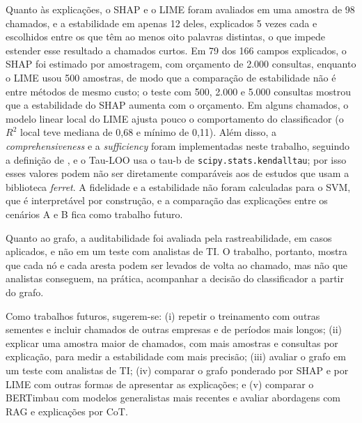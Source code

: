 \documentclass[
    12pt,                %
    openright,           %
    oneside,             %
    a4paper,             %
    english,             %
    brazil               %
]{abntex2}
\begin{document}
Quanto às explicações, o SHAP e o LIME foram avaliados em uma amostra de 98 chamados, e a estabilidade em apenas 12 deles, explicados 5 vezes cada e escolhidos entre os que têm ao menos oito palavras distintas, o que impede estender esse resultado a chamados curtos. Em 79 dos 166 campos explicados, o SHAP foi estimado por amostragem, com orçamento de 2.000 consultas, enquanto o LIME usou 500 amostras, de modo que a comparação de estabilidade não é entre métodos de mesmo custo; o teste com 500, 2.000 e 5.000 consultas mostrou que a estabilidade do SHAP aumenta com o orçamento. Em alguns chamados, o modelo linear local do LIME ajusta pouco o comportamento do classificador (o $R^2$ local teve mediana de 0,68 e mínimo de 0,11). Além disso, a \textit{comprehensiveness} e a \textit{sufficiency} foram implementadas neste trabalho, seguindo a definição de , e o Tau-LOO usa o tau-b de \texttt{scipy.stats.kendalltau}; por isso esses valores podem não ser diretamente comparáveis aos de estudos que usam a biblioteca \textit{ferret}.  A fidelidade e a estabilidade não foram calculadas para o SVM, que é interpretável por construção, e a comparação das explicações entre os cenários A e B fica como trabalho futuro.

Quanto ao grafo, a auditabilidade foi avaliada pela rastreabilidade, em casos aplicados, e não em um teste com analistas de TI. O trabalho, portanto, mostra que cada nó e cada aresta podem ser levados de volta ao chamado, mas não que analistas conseguem, na prática, acompanhar a decisão do classificador a partir do grafo.

Como trabalhos futuros, sugerem-se: (i) repetir o treinamento com outras sementes e incluir chamados de outras empresas e de períodos mais longos; (ii) explicar uma amostra maior de chamados, com mais amostras e consultas por explicação, para medir a estabilidade com mais precisão; (iii) avaliar o grafo em um teste com analistas de TI; (iv) comparar o grafo ponderado por SHAP e por LIME com outras formas de apresentar as explicações; e (v) comparar o BERTimbau com modelos generalistas mais recentes e avaliar abordagens com RAG e explicações por CoT.

\postextual
\end{document}
